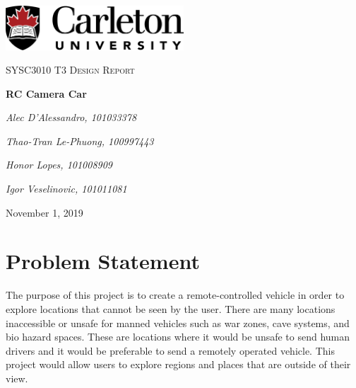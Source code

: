 \documentclass[letterpaper,12pt]{report}
\begin{document}
    \begin{titlepage}
        \centering
        \vspace*{\fill}
        \includegraphics[width=0.5\textwidth]{./diagrams/CarletonUniversityLogo.png}\par\vspace{2cm}
        {\scshape\Large SYSC3010 T3 Design Report\par}
        \vspace{1.5cm}
        {\huge\bfseries RC Camera Car\par}
        \vspace{2cm}
        {\large\itshape Alec D'Alessandro, 101033378\par}
        {\large\itshape Thao-Tran Le-Phuong, 100997443\par}
        {\large\itshape Honor Lopes, 101008909\par}
        {\large\itshape Igor Veselinovic, 101011081\par}
        \vspace*{\fill}

        {\large November 1, 2019\par}
    \end{titlepage}

    \begin{abstract}
        This document will restate the problem statement from the proposal. It
        will also outline the system design and software and hardware component
        designs for the project.
    \end{abstract}

    \tableofcontents

    \pagebreak

    \section{Problem Statement}

    The purpose of this project is to create a remote-controlled vehicle in
    order to explore locations that cannot be seen by the user. There are
    many locations inaccessible or unsafe for manned vehicles such as
    war zones, cave systems, and bio hazard spaces. These are locations where
    it would be unsafe to send human drivers and it would be preferable to
    send a remotely operated vehicle. This project would allow users to
    explore regions and places that are outside of their view.
\end{document}
